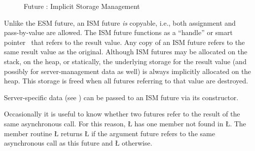 \documentclass[openright,twoside]{report}
\begin{document}
\begin{figure}
%
%
%
%
%
\vspace{-3mm}
\caption{Future : Implicit Storage Management}
\label{f:FutureImplicitStorageManagement}
\end{figure}

Unlike the ESM future, an ISM future \emph{is} copyable, i.e., both assignment and pass-by-value are allowed.
The ISM future functions as a ``handle'' or smart pointer~\cite{Alexandrescu01} that refers to the result value.
Any copy of an ISM future refers to the same result value as the original.
Although ISM futures may be allocated on the stack, on the heap, or statically, the underlying storage for the result value (and possibly for server-management data as well) is always implicitly allocated on the heap.
This storage is freed when all futures referring to that value are destroyed.

Server-specific data (see ) can be passed to an ISM future via its constructor.

Occasionally it is useful to know whether two futures refer to the result of the same asynchronous call.
For this reason, \LGinlinetrue\LGbegin\lgrinde\L{}\endlgrinde\LGend{} has one member not found in \LGinlinetrue\LGbegin\lgrinde\L{}\endlgrinde\LGend{}.
The member routine \LGinlinetrue\LGbegin\lgrinde\L{}\endlgrinde\LGend{} returns \LGinlinetrue\LGbegin\lgrinde\L{}\endlgrinde\LGend{} if the argument future refers to the same asynchronous call as this future and \LGinlinetrue\LGbegin\lgrinde\L{}\endlgrinde\LGend{} otherwise.
\end{document}

